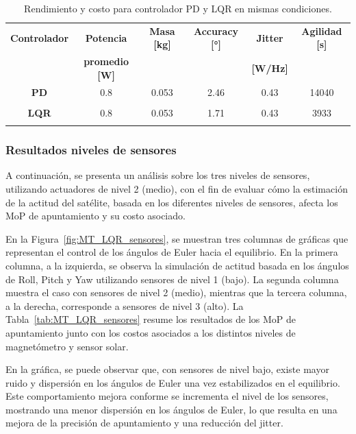 \begin{table}[h!]
	\centering
	\caption{Rendimiento y costo para controlador PD y LQR en mismas condiciones.}
	\begin{tabular}{|c|c|c|c|c|c|}
		\hline
		\textbf{Controlador}   & \textbf{Potencia} & \textbf{Masa [kg]} & \textbf{Accuracy [°]} & \textbf{Jitter} & \textbf{Agilidad [s]}  \\ 
		  & \textbf{promedio [W]} & & & \textbf{[W/Hz]} &  \\
		\hline
		\textbf{PD}   & 0.8  & 0.053  & 2.46 & 0.43 & 14040   \\
		&  &   &  &  &    \\
		\hline
		\textbf{LQR}   & 0.8  & 0.053  & 1.71 & 0.43 & 3933   \\
		& & & & &   \\
		\hline
	\end{tabular}
	\label{tab:PD_LQR_nivel2}
\end{table}

\subsubsection{Resultados niveles de sensores}

A continuación, se presenta un análisis sobre los tres niveles de sensores, utilizando actuadores de nivel 2 (medio), con el fin de evaluar cómo la estimación de la actitud del satélite, basada en los diferentes niveles de sensores, afecta los MoP de apuntamiento y su costo asociado.

En la Figura~\ref{fig:MT_LQR_sensores}, se muestran tres columnas de gráficas que representan el control de los ángulos de Euler hacia el equilibrio. En la primera columna, a la izquierda, se observa la simulación de actitud basada en los ángulos de Roll, Pitch y Yaw utilizando sensores de nivel 1 (bajo). La segunda columna muestra el caso con sensores de nivel 2 (medio), mientras que la tercera columna, a la derecha, corresponde a sensores de nivel 3 (alto). La Tabla~\ref{tab:MT_LQR_sensores} resume los resultados de los MoP de apuntamiento junto con los costos asociados a los distintos niveles de magnetómetro y sensor solar.

En la gráfica, se puede observar que, con sensores de nivel bajo, existe mayor ruido y dispersión en los ángulos de Euler una vez estabilizados en el equilibrio. Este comportamiento mejora conforme se incrementa el nivel de los sensores, mostrando una menor dispersión en los ángulos de Euler, lo que resulta en una mejora de la precisión de apuntamiento y una reducción del jitter.

